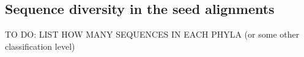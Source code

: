 \subsection{Sequence diversity in the seed alignments}

TO DO: LIST HOW MANY SEQUENCES IN EACH PHYLA (or some other classification level)








